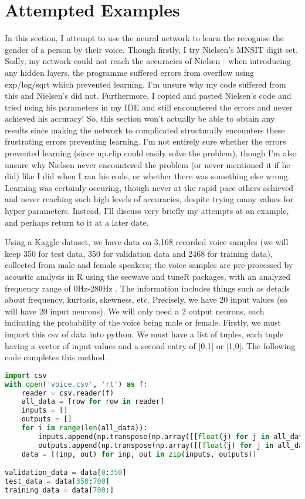 \documentclass[10pt]{article}
\begin{document}
\section{Attempted Examples}
In this section, I attempt to use the neural network to learn the recognise the gender of a person by their voice. Though firstly, I try Nielsen's MNSIT digit set. Sadly, my network could not reach the accuracies of Nielsen - when introducing any hidden layers, the programme suffered errors from overflow using exp/log/sqrt which prevented learning. I'm unsure why my code suffered from this and Nielsen's did not. Furthermore, I copied and pasted Nielsen's code and tried using his parameters in my IDE and still encountered the errors and never achieved his accuracy! So, this section won't actually be able to obtain any results since making the network to complicated structurally encounters these frustrating errors preventing learning. I'm not entirely sure whether the errors prevented learning (since np.clip could easily solve the problem), though I'm also unsure why Nielsen never encountered the problem (or never mentioned it if he did) like I did when I ran his code, or whether there was something else wrong. Learning was certainly occuring, though never at the rapid pace others achieved and never reaching such high levels of accuracies, despite trying many values for hyper parameters. Instead, I'll discuss very briefly my attempts at an example, and perhaps return to it at a later date. \par 
Using a Kaggle dataset, we have data on 3,168 recorded voice samples (we will keep 350 for test data, 350 for validation data and 2468 for training data), collected from male and female speakers; the voice samples are pre-processed by acoustic analysis in R using the seewave and tuneR packages, with an analyzed frequency range of 0Hz-280Hz \cite{kaggle}. The information includes things such as details about frequency, kurtosis, skewness, etc. Precisely, we have 20 input values (so will have 20 input neurons). We will only need a 2 output neurons, each indicating the probability of the voice being male or female. Firstly, we must import this csv of data into python. We must have a list of tuples, each tuple having a vector of input values and a second entry of [0,1] or [1,0]. The following code completes this method.
\begin{lstlisting}[language=Python, breaklines, basicstyle=\small]
import csv
with open('voice.csv', 'rt') as f:
	reader = csv.reader(f)
	all_data = [row for row in reader]
	inputs = []
	outputs = []
	for i in range(len(all_data)):
		inputs.append(np.transpose(np.array([[float(j) for j in all_data[i][:-2]]])))
		outputs.append(np.transpose(np.array([[float(j) for j in all_data[i][-2:]]])))
	data = [(inp, out) for inp, out in zip(inputs, outputs)]

validation_data = data[0:350]
test_data = data[350:700]
training_data = data[700:]
\end{lstlisting}
\end{document}
